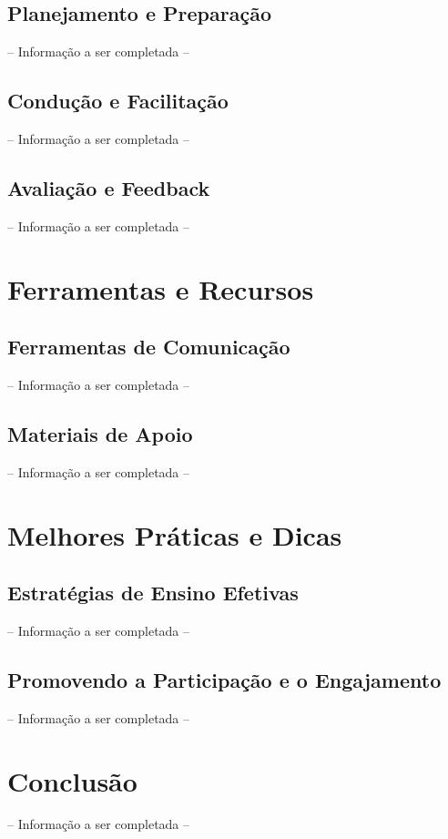 \subsection{Planejamento e Preparação}

-- Informação a ser completada --

\subsection{Condução e Facilitação}

-- Informação a ser completada --

\subsection{Avaliação e Feedback}

-- Informação a ser completada --

\section{Ferramentas e Recursos}

\subsection{Ferramentas de Comunicação}

-- Informação a ser completada --

\subsection{Materiais de Apoio}

-- Informação a ser completada --

\section{Melhores Práticas e Dicas}

\subsection{Estratégias de Ensino Efetivas}

-- Informação a ser completada --

\subsection{Promovendo a Participação e o Engajamento}

-- Informação a ser completada --

\section{Conclusão}

-- Informação a ser completada --


